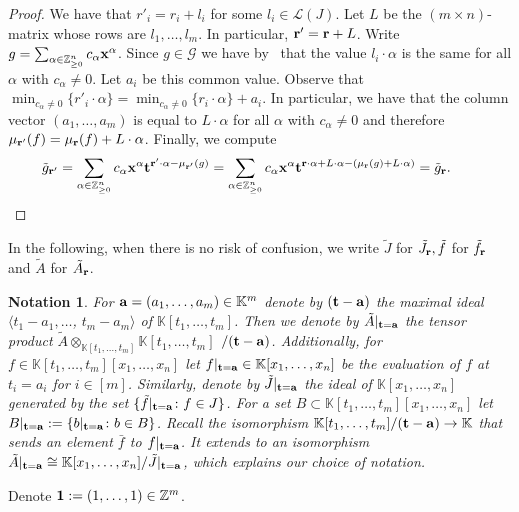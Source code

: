 \documentclass[pdftex]{sigma}%
\newtheorem{Notation}[Theorem]{Notation}
\numberwithin{equation}{section}
\begin{document}
\begin{proof}
We have that $r'_i=r_i+l_i$ for some $l_i \in \mathcal{L}(J)$. Let $L$ be the $(m \times n)$-matrix whose rows are $l_1, \dots , l_m$. In particular, ${\bf r'}={\bf r}+L$.
Write $g=\sum_{\alpha \in \mathbb Z^n_{\geq 0}}c_{\alpha} {\bf x}^{\alpha}$.
Since $g \in \mathcal{G}$ we have by~ that the value $l_i \cdot \alpha$ is the same for all $\alpha $ with $c_{\alpha}\neq 0$. Let $a_i$ be this common value.
Observe that $\min_{c_\alpha \neq 0}\{r'_i\cdot \alpha\}= \min_{c_\alpha \neq 0}\{r_i\cdot \alpha\}+a_i$. In particular, we have that the column vector $ (a_1, \dots , a_m)$ is equal to $ L \cdot \alpha$ for all $\alpha$ with $c_{\alpha}\neq 0$ and therefore $\mu_{\bf r'}(f)= \mu_{\bf r}(f)+L\cdot \alpha$.
Finally, we compute
\begin{displaymath}
\tilde{g}_{\bf r'}=\sum_{\alpha \in \mathbb Z^n_{\geq 0}}c_{\alpha} {\bf x}^{\alpha}{\bf t}^{{\bf r}'\cdot \alpha-\mu_{\bf r'}(g)}=
\sum_{\alpha \in \mathbb Z^n_{\geq 0}}c_{\alpha} {\bf x}^{\alpha}{\bf t}^{{\bf r}\cdot \alpha+ L\cdot \alpha -(\mu_{\bf r}(g)+L\cdot \alpha)}=
\tilde{g}_{\bf r}.\tag*{\qed}
\end{displaymath}
\renewcommand{\qed}{}
\end{proof}

In the following, when there is no risk of confusion, we write $\tilde J$ for $\tilde J_{\bf r},\tilde f$ for $\tilde f_{\bf r}$ and $\tilde A$ for $\tilde A_{\bf r}$.

{\samepage\begin{Notation}
For ${\bf a}=(a_1, \dots , a_m)\in \mathbb K^m$ denote by $({\bf t}-{\bf a})$ the maximal ideal $\langle t_1-a_1,\dots$, \mbox{$t_m-a_m\rangle$} of $\mathbb K[t_1,\dots,t_m]$.
Then we denote by $\tilde A\vert_{{\bf t}={\bf a}}$ the tensor product $\tilde A\otimes_{\mathbb K[t_1,\dots,t_m]} \mathbb K[t_1,\dots,t_m]$ $/({\bf t}-{\bf a})$.
Additionally, for $f\in \mathbb K[t_1,\dots,t_m][x_1,\dots,x_n]$ let $f\vert_{{\bf t}={\bf a}} \in \mathbb K[x_1,\dots,x_n]$ be the evaluation of $f$ at $t_i = a_i$ for $i \in [m]$.
Similarly, denote by $\tilde J\vert_{{\bf t}={\bf a}}$ the ideal of $\mathbb K[x_1,\dots,x_n]$ generated by the set $\lbrace \tilde{f}\vert_{{\bf t}={\bf a}} \colon f\in J \rbrace$.
For a set $B\subset \mathbb K[t_1,\dots,t_m][x_1,\dots,x_n]$ let $B\vert_{{\bf t}={\bf a}}:=\{b\vert_{{\bf t}={\bf a}}\colon b\in B\}$.
Recall the isomorphism $\mathbb K[t_1,\dots,t_m]/({\bf t}-{\bf a})\to \mathbb K$ that sends an element $\bar f$ to $f\vert_{{\bf t}={\bf a}}$.
It extends to an isomorphism $\tilde A\vert_{{\bf t}={\bf a}}\cong \mathbb K[x_1,\dots,x_n]/\tilde J\vert_{{\bf t}={\bf a}}$, which explains our choice of notation.
\end{Notation}

Denote ${\bf 1}:=(1,\dots,1)\in \mathbb Z^m$.

}
\end{document}
